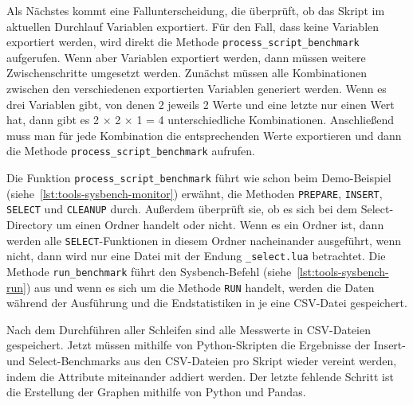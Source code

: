 Als Nächstes kommt eine Fallunterscheidung, die überprüft, ob das Skript im aktuellen Durchlauf Variablen exportiert.
Für den Fall, dass keine Variablen exportiert werden, wird direkt die Methode \texttt{process\_script\_benchmark} aufgerufen.
Wenn aber Variablen exportiert werden, dann müssen weitere Zwischenschritte umgesetzt werden.
Zunächst müssen alle Kombinationen zwischen den verschiedenen exportierten Variablen generiert werden.
Wenn es drei Variablen gibt, von denen 2 jeweils 2 Werte und eine letzte nur einen Wert hat, dann gibt es 2 × 2 × 1 = 4 unterschiedliche Kombinationen.
Anschließend muss man für jede Kombination die entsprechenden Werte exportieren und dann die Methode \texttt{process\_script\_benchmark} aufrufen.

Die Funktion \texttt{process\_script\_benchmark} führt wie schon beim Demo-Beispiel (siehe~\ref{lst:tools-sysbench-monitor}) erwähnt, die Methoden \texttt{PREPARE}, \texttt{INSERT}, \texttt{SELECT} und \texttt{CLEANUP} durch.
Außerdem überprüft sie, ob es sich bei dem Select-Directory um einen Ordner handelt oder nicht.
Wenn es ein Ordner ist, dann werden alle \texttt{SELECT}-Funktionen in diesem Ordner nacheinander ausgeführt, wenn nicht, dann wird nur eine Datei mit der Endung \texttt{\_select.lua} betrachtet.
Die Methode \texttt{run\_benchmark} führt den Sysbench-Befehl (siehe~\ref{lst:tools-sysbench-run}) aus und wenn es sich um die Methode \texttt{RUN} handelt, werden die Daten während der Ausführung und die Endstatistiken in je eine CSV-Datei gespeichert.

\vspace{-8pt}

\vspace{-5pt}

Nach dem Durchführen aller Schleifen sind alle Messwerte in CSV-Dateien gespeichert.
Jetzt müssen mithilfe von Python-Skripten die Ergebnisse der Insert- und Select-Benchmarks aus den CSV-Dateien pro Skript wieder vereint werden, indem die Attribute miteinander addiert werden.
Der letzte fehlende Schritt ist die Erstellung der Graphen mithilfe von Python und Pandas.

%

